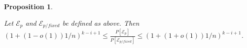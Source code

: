 \documentclass[11pt]{article}
\newtheorem{proposition}{Proposition}[section]
\newcommand{\qed}{\hfill \mbox{\raggedright \rule{2mm}{3mm}}}
\newenvironment{proof}{\noindent{\bf Proof.}}{\qed}
\begin{document}
\vspace*{-0.1cm}
\begin{proposition}\label{transf_fraction}
\begin{sloppypar}
Let $\mathcal{E}_p$ and $\mathcal{E}_{p/fixed}$ be defined as above. 
Then  \\
$(1+(1-o(1))1/n)^{k-i+1}\leq
\frac{P[\mathcal{E}_p]}{P[\mathcal{E}_{p/fixed}]}\leq
(1+(1+o(1))1/n)^{k-i+1}$.
\end{sloppypar}
\end{proposition}
\vspace*{-0.1cm}

\begin{comment}
\begin{proof}
Consider again the random experiment of the proof of Proposition \ref{level-ratio}. Recall that
$ w^2_{ch} \leq w^1_{ch} \leq w^2_{ch}(1+1/n)$. Note that again both $w^1_{ch},w^2_{ch}$ are $\Theta (n^3)$ and $k-i+1<n$. In the ball tossing experiment, the probability of success of ball $j_r$ in the case where the capacities of the cheap bins is $w^1_{ch}$ is at most $(1+2/n)$ the probability of success of the same event in the case where the capacities of the cheap bins is $w^2_{ch}$ (we are very generous here). So the ratio $\frac{P[\mathcal{E}_p]}{P[\mathcal{E}_{p/fixed}]}\leq (1+2/n)^{k-i+1} < e^2$ using that $\lim_{x \rightarrow \infty}(1+d/x)^{x}=e^d$.
\end{proof}
\end{comment}
\end{document}
